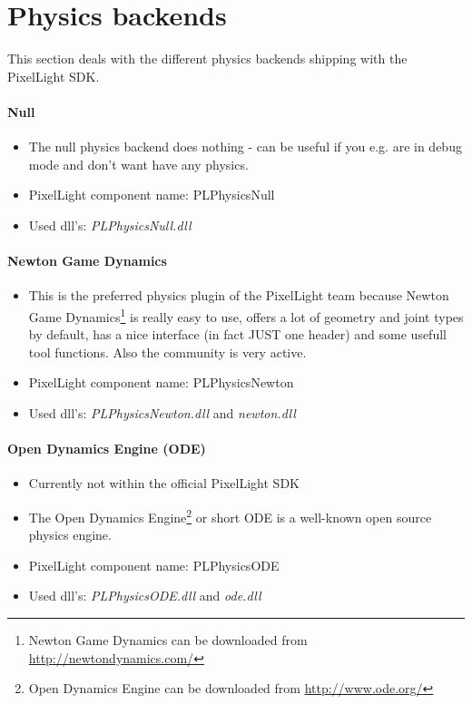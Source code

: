 \section{Physics backends}
This section deals with the different physics backends shipping with the PixelLight SDK.


\paragraph{Null}
\begin{itemize}
\item The null physics backend does nothing - can be useful if you e.g. are in debug mode and don't want have any physics.
\item PixelLight component name: PLPhysicsNull
\item Used dll's: \emph{PLPhysicsNull.dll}
\end{itemize}


\paragraph{Newton Game Dynamics}
\begin{itemize}
\item This is the preferred physics plugin of the PixelLight team because Newton Game Dynamics\footnote{Newton Game Dynamics can be downloaded from \url{http://newtondynamics.com/}} is really easy to use, offers a lot of geometry and joint types by default, has a nice interface (in fact JUST one header) and some usefull tool functions. Also the community is very active.
\item PixelLight component name: PLPhysicsNewton
\item Used dll's: \emph{PLPhysicsNewton.dll} and \emph{newton.dll}
\end{itemize}


\paragraph{Open Dynamics Engine (ODE)}
\begin{itemize}
\item Currently not within the official PixelLight SDK
\item The Open Dynamics Engine\footnote{Open Dynamics Engine can be downloaded from \url{http://www.ode.org/}} or short ODE is a well-known open source physics engine.
\item PixelLight component name: PLPhysicsODE
\item Used dll's: \emph{PLPhysicsODE.dll} and \emph{ode.dll}
\end{itemize}


